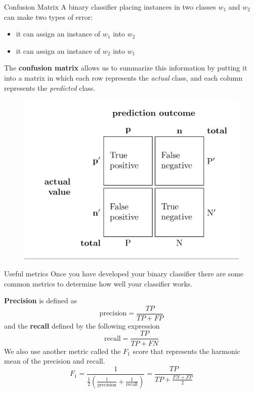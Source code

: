 \documentclass{beamer}
\begin{document}
\begin{frame}{Confusion Matrix}
	A binary classifier placing instances in two classes $w_1$ and $w_2$ can make two types of error:
	\begin{itemize}
		\item it can assign an instance of $w_1$ into $w_2$
		\item it can assign an instance of $w_2$ into $w_1$
	\end{itemize}
The {\bf confusion matrix} allows us to summarize this information by putting it into a matrix in which each row represents the {\it actual} class, and each column represents the {\it predicted} class.

\begin{figure}
	\centering
	\includegraphics[scale=0.25]{../../Figures/fig_confusionmatrix.png}
\end{figure}

\end{frame}



\begin{frame}{Useful metrics}
	Once you have developed your binary classifier there are some common metrics to determine how well your classifier works.
	
	{\bf Precision} is defined as
	\begin{equation*}
		\textrm{precision}= \frac{TP}{TP+FP}
	\end{equation*}
	and the {\bf recall}  defined by the following expression
	\begin{equation*}
		\textrm{recall}= \frac{TP}{TP+FN}
	\end{equation*}
We also use another metric called the $F_1$ score that represents the harmonic mean of the precision and recall. 
\begin{equation*}
F_1= \frac{1}{\frac{1}{2}( \frac{1}{\textrm{precision}}+ \frac{1}{\textrm{recall}})}=\frac{TP}{TP+ \frac{FN+FP}{2}}
\end{equation*}
\end{frame}	
\end{document}

